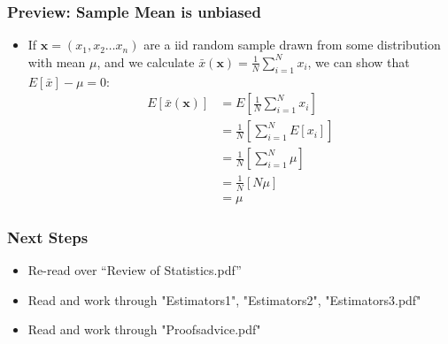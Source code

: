 \documentclass[aspectratio=169, handout]{beamer}
\numberwithin{equation}{section}
\begin{document}
\begin{frame}
\frametitle{Preview: Sample Mean is unbiased}
\begin{itemize}
\item If $\boldsymbol{x}=(x_1, x_2 \ldots x_n)$ are a iid random sample drawn from some distribution with mean $\mu$, and we calculate $\bar{x}(\boldsymbol{x})=\frac{1}{N}\sum_{i=1}^N x_i$, we can show that $E[\bar{x}]-\mu=0$:
\begin{align*}
E[\bar{x}(\boldsymbol{x})]&=E[\frac{1}{N}\sum_{i=1}^N x_i]\\
&=\frac{1}{N}[\sum_{i=1}^N E[x_i]]\\
&=\frac{1}{N}[\sum_{i=1}^N \mu]\\
&=\frac{1}{N}[N \mu]\\
&=\mu
\end{align*}
\end{itemize}
\end{frame}



\begin{frame}
\frametitle{Next Steps}
\begin{itemize}
\item Re-read over ``Review of Statistics.pdf''
\item Read and work through "Estimators1", "Estimators2", "Estimators3.pdf"
\item Read and work through "Proofsadvice.pdf"
\end{itemize}
\end{frame}
\end{document}
